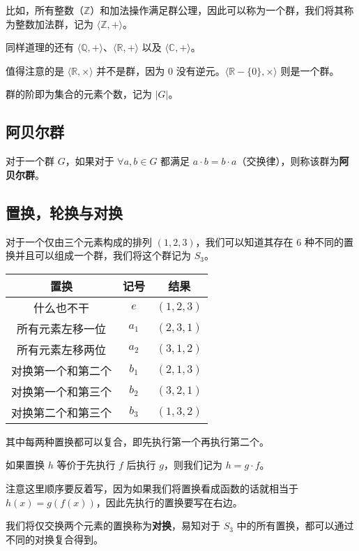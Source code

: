 \documentclass[hyperref,UTF8,12pt,a4paper]{ctexart}
\begin{document}
比如，所有整数（$\mathbb Z$）和加法操作满足群公理，因此可以称为一个群，我们将其称为整数加法群，记为 $\langle\mathbb Z, +\rangle$。

同样道理的还有 $\langle\mathbb Q, +\rangle$、$\langle\mathbb R, +\rangle$ 以及 $\langle\mathbb C, +\rangle$。

值得注意的是 $\langle\mathbb R, \times\rangle$ 并不是群，因为 $0$ 没有逆元。$\langle\mathbb R - \{0\}, \times\rangle$ 则是一个群。

群的阶即为集合的元素个数，记为 $|G|$。

\subsection{阿贝尔群}

对于一个群 $G$，如果对于 $\forall a,b \in G$ 都满足 $a \cdot b = b \cdot a$（交换律），则称该群为\textbf{阿贝尔群}。

\subsection{置换，轮换与对换}

对于一个仅由三个元素构成的排列 $(1, 2, 3)$，我们可以知道其存在 $6$ 种不同的置换并且可以组成一个群，我们将这个群记为 $S_3$。

\begin{table}[ht]
\centering
\begin{tabular}{c c c}
\hline
置换 & 记号 & 结果 \\
\hline
什么也不干        & $e$   & $(1, 2, 3)$ \\
所有元素左移一位   & $a_1$ & $(2, 3, 1)$ \\
所有元素左移两位   & $a_2$ & $(3, 1, 2)$ \\
对换第一个和第二个 & $b_1$ & $(2, 1, 3)$ \\
对换第一个和第三个 & $b_2$ & $(3, 2, 1)$ \\
对换第二个和第三个 & $b_3$ & $(1, 3, 2)$ \\
\hline
\end{tabular}
\end{table}

其中每两种置换都可以复合，即先执行第一个再执行第二个。

如果置换 $h$ 等价于先执行 $f$ 后执行 $g$，则我们记为 $h=g \cdot f$。

注意这里顺序要反着写，因为如果我们将置换看成函数的话就相当于 $h(x)=g(f(x))$，因此先执行的置换要写在右边。

我们将仅交换两个元素的置换称为\textbf{对换}，易知对于 $S_3$ 中的所有置换，都可以通过不同的对换复合得到。
\end{document}
